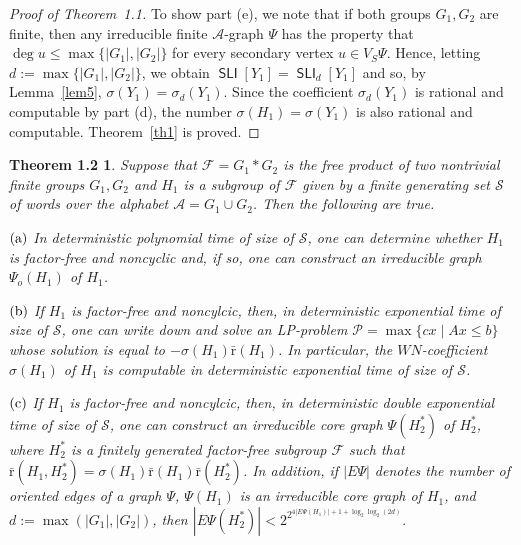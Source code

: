 \documentclass[10pt, reqno]{amsart}
\numberwithin{equation}{section}
\newtheorem*{T2}{Theorem 1.2}
\begin{document}
\begin{proof}[Proof of Theorem~1.1]
 To show part (e), we note that if both groups $G_1, G_2$ are finite,
 then any irreducible finite ${\mathcal{A}}$-graph  $\Psi$ has the property that $\deg u \le \max \{ |G_1 |, |G_2| \}$
 for every secondary vertex $u \in V_S \Psi$. Hence, letting $d := \max \{ |G_1 |, |G_2| \}$, we obtain  $\operatorname{\textsf{SLI}}[Y_1] =  \operatorname{\textsf{SLI}}_{d}[Y_1]$ and so,
 by Lemma~\ref{lem5}, $\sigma( Y_1) = \sigma_{d}( Y_1)$. Since  the  coefficient  $\sigma_{d}( Y_1)$
 is rational and computable by part (d), the  number $\sigma(H_1) = \sigma( Y_1)$ is also rational and computable.
  Theorem~\ref{th1} is proved.  \end{proof}

\begin{T2}  Suppose that ${\mathcal{F}} =G_1 * G_2$ is the free product of two nontrivial finite groups $G_1,  G_2$ and $H_1$ is a subgroup of ${\mathcal{F}}$ given by a finite generating set ${\mathcal{S}}$ of words over the alphabet
${\mathcal{A}} = G_1 \cup G_2$. Then the following are true.

$\rm{(a)}$ In deterministic polynomial time of size of ${\mathcal{S}}$, one can
determine whether $H_1$ is factor-free and noncyclic and, if so, one can construct an  irreducible graph $\Psi_o(H_1)$  of $H_1$.

$\rm{(b)}$  If  $H_1$ is factor-free and noncylcic, then, in deterministic exponential time of size of ${\mathcal{S}}$, one can write down and solve an LP-problem ${\mathcal{P}} = \max\{ cx \mid Ax \le b  \}$ whose solution is equal to $-\sigma(H_1) {\bar {\mathrm{r}}} (H_1)$. In particular, the $WN$-coefficient $\sigma(H_1)$ of $H_1$ is computable in deterministic exponential time of size of ${\mathcal{S}}$.

$\rm{(c)}$  If  $H_1$ is factor-free and noncylcic, then, in deterministic double exponential time of size of ${\mathcal{S}}$, one can construct an irreducible core graph $\Psi(H_2^*)$ of $H_2^*$, where $H_2^*$ is a finitely generated factor-free subgroup ${\mathcal{F}}$ such that
$\bar {\mathrm{r}}(H_1, H_2^*) =  \sigma(H_1)  \bar {\mathrm{r}}(H_1) \bar {\mathrm{r}}( H_2^*)$.
In addition, if $| E\Psi |$ denotes the number of oriented edges of a graph $\Psi$, $\Psi(H_1)$ is an irreducible core graph of $H_1$, and   $d := \max( |G_1|, |G_2|)$, then
$
| E \Psi(H_2^*) |  <  2^{ 2^{4| E \Psi(H_1) | +1+ \log_2 \log_2 (2d)  } } .
$
\end{T2}
\end{document}
